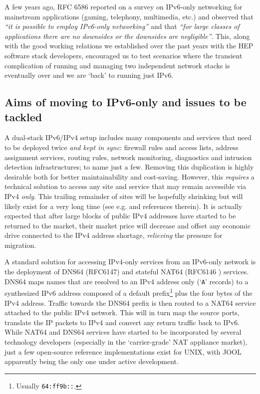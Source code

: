 
A few years ago, RFC 6586 \cite{rfc} reported on a survey on IPv6-only
networking for mainstream applications (gaming, telephony,
multimedia, etc.) and observed that {\it  ``it is possible to employ IPv6-only
networking''} and that {\it ``for large classes of applications
there are no downsides or the downsides are negligible''}.
This, along with the good working relations we established over
the past years with the HEP software stack developers,
encouraged us to test 
scenarios where the transient complication of running and managing
two independent network stacks is eventually over and we are `back' to
running just IPv6.

\subsection{Aims of moving to IPv6-only and issues to be tackled}
\label{ssec:ipv6onlymove}
A dual-stack IPv6/IPv4 setup includes many components and services that need
to be deployed twice {\it and kept in sync}: firewall rules and access
lists, address assignment services, routing rules, network monitoring,
diagnostics and
intrusion detection infrastructures; to name just a few.
Removing this duplication is highly desirable both for better maintainability
and cost-saving.
However, this {\it requires} a technical
solution to access any site and service that may remain accessible via IPv4
{\it only}.
This trailing remainder of sites will be hopefully
shrinking but will likely exist for a very long time (see
e.g. \cite{ipv6trans} and references therein).
It is actually expected that after large blocks of public IPv4
addresses have started to be returned to the market, their market price will
decrease and offset any economic drive connected to the IPv4 address shortage,
{\it relieving} the pressure for migration.\par

A standard solution for accessing IPv4-only services from an IPv6-only
network is the deployment of DNS64 (RFC6147) and stateful
NAT64 (RFC6146 \cite{rfc}) services. DNS64 maps names that are resolved to
an IPv4 address only (`{\tt A}' records) to a synthesized IPv6 address composed
of a default prefix\footnote{Usually {\tt 64:ff9b::}.} plus the four bytes of
the IPv4 address. Traffic towards the DNS64 prefix is then routed to
a NAT64 service attached to the public IPv4 network. This will in turn map the
source ports, translate the IP packets to IPv4 and convert any return traffic
back to IPv6. While NAT64 and DNS64 services have started to be incorporated by
several technology developers (especially in the `carrier-grade' NAT 
appliance market),
just a few open-source reference implementations exist for UNIX, with
JOOL \cite{jool} apparently being the only one 
under active development.\par

